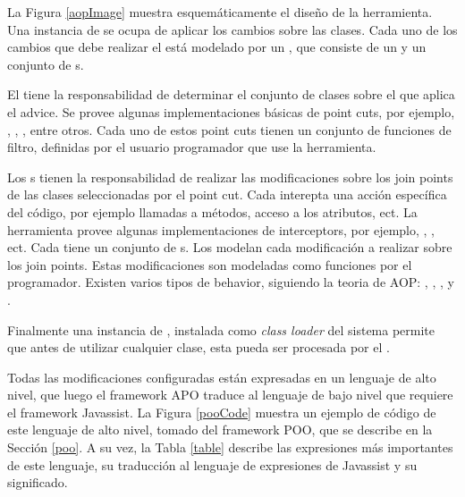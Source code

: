 	La Figura \ref{aopImage} muestra esquemáticamente el diseño de la herramienta.
	Una instancia de  se ocupa de aplicar los cambios sobre las
	clases.
	Cada uno de los cambios que debe realizar el  está
	modelado por un , que consiste de un  y un conjunto de 
	s.
	
	El  tiene la responsabilidad de determinar el conjunto de
	clases sobre el que aplica el advice. Se provee algunas implementaciones básicas
	de point cuts, por ejemplo, , , 
	, entre otros. Cada uno de estos point cuts tienen un conjunto de funciones
	de filtro, definidas por el usuario programador que use la herramienta. 

	Los s tienen la responsabilidad de realizar las modificaciones sobre 
	los join points de las clases seleccionadas por el point cut. 
 	Cada  interepta una acción específica del código, por ejemplo
 	llamadas a métodos, acceso a los atributos, ect. La herramienta provee algunas implementaciones de interceptors,
 	por ejemplo, , , ect. 
 	Cada  tiene un conjunto de s.
 	Los  modelan cada modificación a realizar sobre los join points. 
 	Estas modificaciones son modeladas como funciones por el programador.
 	Existen varios tipos de behavior, siguiendo la teoria de AOP: 
 	, , ,  y . 
	 
	Finalmente una instancia de , instalada como \emph{class
	loader} del sistema permite que antes de utilizar cualquier clase, esta pueda
	ser procesada por el .
	
	Todas las modificaciones configuradas están expresadas en un
	lenguaje de alto nivel, que luego el framework APO traduce al lenguaje de bajo nivel que requiere el
	framework Javassist.
	La Figura \ref{pooCode} muestra un ejemplo de código de este lenguaje de alto nivel,
	tomado del framework POO, que se describe en la Sección \ref{poo}.
	A su vez, la Tabla \ref{table} describe las expresiones más importantes de este lenguaje, 
	su traducción al lenguaje de expresiones de Javassist y su significado.
	
